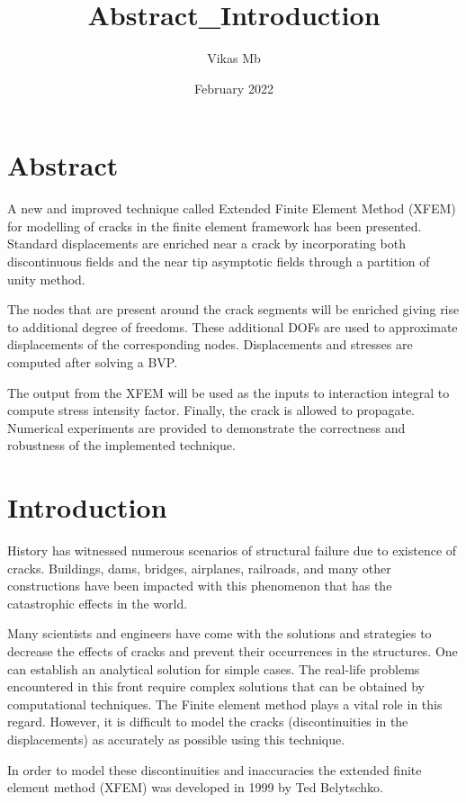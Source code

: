 \documentclass[fleqn, 12.5pt,a4paper]{report}
\title{Abstract_Introduction}
\author{Vikas Mb}
\date{February 2022}
\begin{document}

\vspace{-10cm}
\setlength{\cftbeforetoctitleskip}{-5em}
\tableofcontents
\newpage
\setlength{\cftbeforeloftitleskip}{-5em}
\listoffigures
\newpage

\section{\large{Abstract}}
A new and improved technique called Extended Finite Element Method (XFEM) for modelling of cracks in the finite element framework has been presented. Standard displacements are enriched near a crack by incorporating both discontinuous fields and the near tip asymptotic fields through a partition of unity method\cite{khoei2014extended}. \par
\vspace{0.25cm}
The nodes that are present around the crack segments will be enriched giving rise to additional degree of freedoms. These additional DOFs are used to approximate displacements of the corresponding nodes. Displacements and stresses are computed after solving a BVP. \par 
\vspace{0.25cm}
The output from the XFEM will be used as the inputs to interaction integral to compute stress intensity factor. Finally, the crack is allowed to propagate. Numerical experiments are provided to demonstrate the correctness and robustness of the implemented technique.

\section{\large Introduction}
History has witnessed numerous scenarios of structural failure due to existence of cracks. Buildings, dams, bridges, airplanes, railroads, and many other constructions have been impacted with this phenomenon that has the catastrophic effects in the world\cite{kuna2013finite}. \par
\vspace{0.25cm}
Many scientists and engineers have come with the solutions and strategies to decrease the effects of cracks and prevent their occurrences in the structures. 
One can establish an analytical solution for simple cases. The real-life problems encountered in this front require complex solutions that can be obtained by computational techniques\cite{kuna2013finite}. The Finite element method plays a vital role in this regard. However, it is difficult to model the cracks (discontinuities in the displacements) as accurately as possible using this technique. \par
\vspace{0.25cm}
In order to model these discontinuities and inaccuracies the extended finite element method (XFEM) was developed in 1999 by Ted Belytschko\cite{belytschko1999elastic}.
\end{document}
